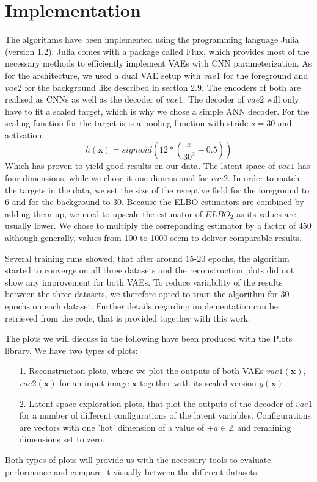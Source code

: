 \documentclass[12pt]{report}
\theoremstyle{definition}
\begin{document}
\section{Implementation}
The algorithms have been implemented using the programming language Julia (version 1.2). Julia comes with a package called Flux, which provides most of the necessary methods to efficiently implement VAEs with CNN parameterization.
As for the architecture, we used a dual VAE setup with $vae1$ for the foreground and $vae2$ for the background like described in section 2.9. The encoders of both are realised as CNNs as well as the decoder of $vae1$. The decoder of $vae2$ will only have to fit a scaled target, which is why we chose a simple ANN decoder. For the scaling function for the target is is a pooling function with stride $s=30$ and activation:
\begin{equation}
h(\mathbf{x}) = sigmoid(12*(\frac{x}{30^2}-0.5))
\end{equation}
Which has proven to yield good results on our data. The latent space of $vae1$ has four dimensions, while we chose it one dimensional for $vae2$. In order to match the targets in the data, we set the size of the receptive field for the foreground to 6 and for the background to 30. Because the ELBO estimators are combined by adding them up, we need to upscale the estimator of $ELBO_2$ as its values are usually lower. We chose to multiply the correponding estimator by a factor of 450 although generally, values from 100 to 1000 seem to deliver comparable results.

Several training runs showed, that after around 15-20 epochs, the algorithm started to converge on all three datasets and the reconstruction plots did not show any improvement for both VAEs. To reduce variability of the results between the three datasets, we therefore opted to train the algorithm for 30 epochs on each dataset.
Further details regarding implementation can be retrieved from the code, that is provided together with this work.

The plots we will discuss in the following have been produced with the Plots library. We have two types of plots:
\begin{itemize}
\item[1.] Reconstruction plots, where we plot the outputs of both VAEs $vae1(\mathbf{x})$, $vae2(\mathbf{x})$ for an input image $\mathbf{x}$ together with its scaled version $g(\mathbf{x})$.
\item[2.] Latent space exploration plots, that plot the outputs of the decoder of $vae1$ for a number of different configurations of the latent variables. Configurations are vectors with one 'hot' dimension of a value of $\pm a \in \mathbb{Z}$ and remaining dimensions set to zero.
\end{itemize}
Both types of plots will provide us with the necessary tools to evaluate performance and compare it visually between the different datasets.
\end{document}
